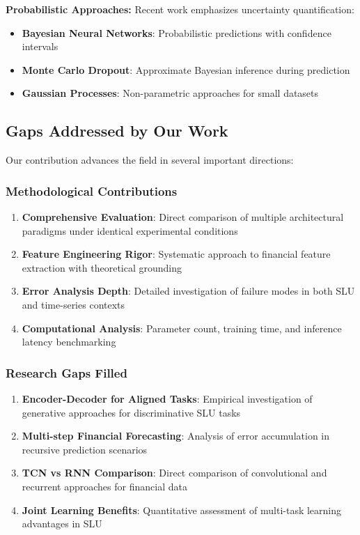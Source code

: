 \documentclass[conference]{IEEEtran}
\begin{document}
\textbf{Probabilistic Approaches:}
Recent work emphasizes uncertainty quantification:
\begin{itemize}
  \item \textbf{Bayesian Neural Networks}: Probabilistic predictions with confidence intervals
  \item \textbf{Monte Carlo Dropout}: Approximate Bayesian inference during prediction
  \item \textbf{Gaussian Processes}: Non-parametric approaches for small datasets
\end{itemize}

\subsection{Gaps Addressed by Our Work}

Our contribution advances the field in several important directions:

\subsubsection{Methodological Contributions}
\begin{enumerate}
  \item \textbf{Comprehensive Evaluation}: Direct comparison of multiple architectural paradigms under identical experimental conditions
  \item \textbf{Feature Engineering Rigor}: Systematic approach to financial feature extraction with theoretical grounding
  \item \textbf{Error Analysis Depth}: Detailed investigation of failure modes in both SLU and time-series contexts
  \item \textbf{Computational Analysis}: Parameter count, training time, and inference latency benchmarking
\end{enumerate}

\subsubsection{Research Gaps Filled}
\begin{enumerate}
  \item \textbf{Encoder-Decoder for Aligned Tasks}: Empirical investigation of generative approaches for discriminative SLU tasks
  \item \textbf{Multi-step Financial Forecasting}: Analysis of error accumulation in recursive prediction scenarios
  \item \textbf{TCN vs RNN Comparison}: Direct comparison of convolutional and recurrent approaches for financial data
  \item \textbf{Joint Learning Benefits}: Quantitative assessment of multi-task learning advantages in SLU
\end{enumerate}
\end{document}
